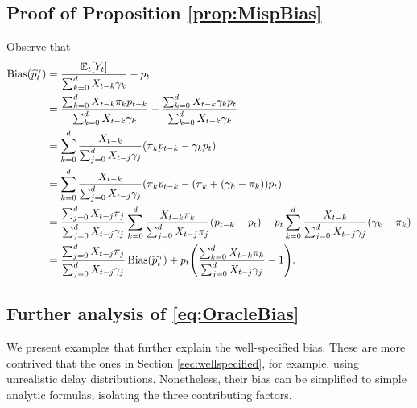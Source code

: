 \documentclass{article}
\renewcommand{\hat}{\widehat} %
\DeclareMathOperator{\bias}{Bias}
\begin{document}

\subsection{Proof of Proposition \ref{prop:MispBias}}
\label{apx:MispBias}

Observe that
\begin{align*}
\bias(\hat{p}_t^\gamma) 
&= \frac{\E_t[Y_t]}{\sum_{k=0}^d X_{t-k}\gamma_k} - p_t \\
&= \frac{\sum_{k=0}^d X_{t-k}\pi_k p_{t-k}}{\sum_{k=0}^d X_{t-k}\gamma_k} -
\frac{\sum_{k=0}^d X_{t-k}\gamma_k p_t}{\sum_{k=0}^d X_{t-k}\gamma_k} \\
&= \sum_{k=0}^d \frac{X_{t-k}}{\sum_{j=0}^d X_{t-j}\gamma_j}
(\pi_k p_{t-k} - \gamma_k p_t) \\
&= \sum_{k=0}^d \frac{X_{t-k}}{\sum_{j=0}^d X_{t-j}\gamma_j}
(\pi_k p_{t-k}-(\pi_k +(\gamma_k-\pi_k)) p_t) \\
&= \frac{\sum_{j=0}^d X_{t-j}\pi_j}{\sum_{j=0}^d X_{t-j}\gamma_j}
\sum_{k=0}^d \frac{X_{t-k}\pi_k}{\sum_{j=0}^d X_{t-j}\pi_j}(p_{t-k}-p_t) -
p_t\sum_{k=0}^d \frac{X_{t-k}}{\sum_{j=0}^d X_{t-j}\gamma_j}(\gamma_k -\pi_k) \\ 
&= \frac{\sum_{j=0}^d X_{t-j}\pi_j}{\sum_{j=0}^d X_{t-j}\gamma_j} 
\bias(\hat{p}_t^\pi) + p_t\Bigg( \frac{\sum_{k=0}^d X_{t-k}\pi_k} 
{\sum_{j=0}^d X_{t-j}\gamma_j}-1\Bigg).
\end{align*}

\subsection{Further analysis of \eqref{eq:OracleBias}}
\label{apx:analysis}

We present examples that further explain the well-specified bias. These are more
contrived that the ones in Section \ref{sec:wellspecified}, for example, using
unrealistic delay distributions. Nonetheless, their bias can be simplified to 
simple analytic formulas, isolating the three contributing factors. 
\end{document}
